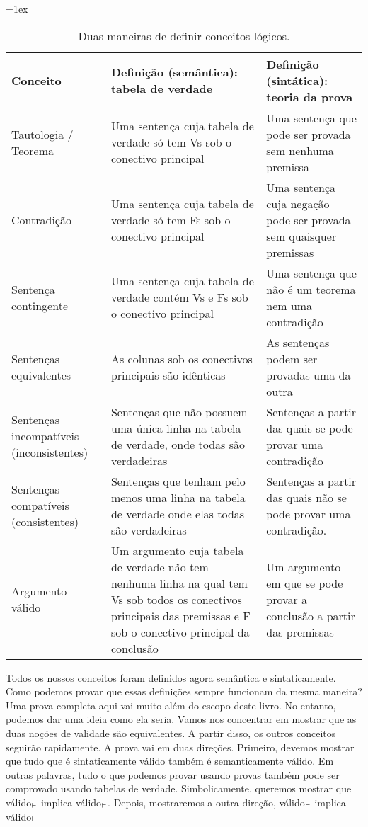 \begin{sidewaystable}\small
\tabulinesep=1ex
\begin{tabu}{X[.5,c,m] ||X[1,l,m] |X[1,l,m]}
\textbf{Conceito} 		&	\textbf{Definição (semântica): tabela de verdade} 	&	\textbf{ Definição  (sintática):  teoria da prova} \\ \hline \hline

Tautologia / Teorema  &	Uma sentença cuja tabela de verdade só tem Vs sob o conectivo principal  & Uma sentença que pode ser provada sem nenhuma premissa	 \\ \hline
 
Contradição		&	Uma sentença cuja tabela de verdade só tem Fs sob o conectivo principal  &	Uma sentença cuja negação pode ser provada sem quaisquer premissas\\ \hline

Sentença contingente	&	Uma sentença cuja tabela de verdade contém Vs e Fs sob o  conectivo principal & Uma sentença que não é um teorema nem uma contradição \\ \hline

Sentenças equivalentes  &	As colunas sob os conectivos principais são idênticas & As sentenças podem ser provadas uma da outra	\\ \hline

Sentenças  incompatíveis (inconsistentes)	&	Sentenças que não possuem uma única linha na tabela de verdade, onde todas são verdadeiras	& Sentenças a partir das quais se pode provar uma contradição \\ \hline

Sentenças  compatíveis (consistentes)	&	Sentenças que tenham pelo menos uma linha na tabela de verdade onde elas todas são verdadeiras & Sentenças  a partir das quais não se pode provar uma contradição.	\\ \hline

Argumento válido 		&	Um argumento cuja tabela de verdade não tem  nenhuma linha  na qual  tem Vs sob todos os conectivos principais das premissas e F sob o conectivo principal da conclusão  & Um argumento em que se pode provar a conclusão a partir das premissas	\\ 
\end{tabu}
\caption{Duas maneiras de definir conceitos lógicos.}
\label{table:truth_tables_or_derivations}
\end{sidewaystable}


Todos os nossos conceitos foram definidos agora semântica e sintaticamente. Como podemos provar que essas definições sempre funcionam da mesma maneira? Uma prova completa aqui vai muito além do escopo deste livro. No entanto, podemos dar uma ideia como ela seria. Vamos nos concentrar em mostrar que as duas noções de validade são equivalentes. A partir disso, os outros conceitos seguirão rapidamente. A  prova vai em duas direções. Primeiro, devemos mostrar que tudo que é sintaticamente válido também é semanticamente válido.  
Em outras palavras, tudo o que podemos provar usando provas também pode ser comprovado usando tabelas de verdade. Simbolicamente,  queremos mostrar que  válido$_{\vdash}$ implica válido$_{\vDash}$. Depois, mostraremos a outra  direção, válido$_{\vDash}$ implica válido$_{\vdash}$



